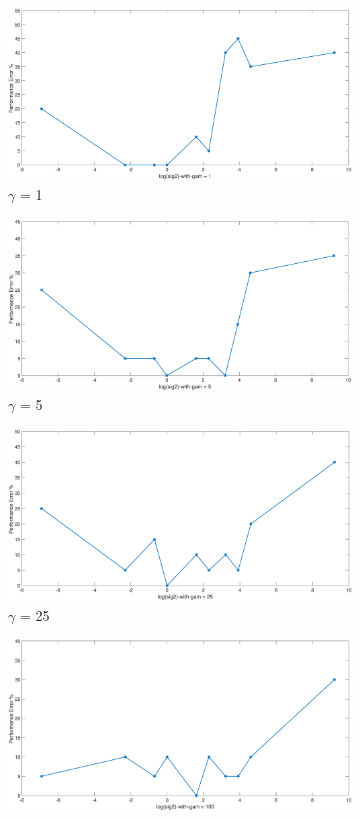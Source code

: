 {\begin{figure}[!ht]
\begin{floatrow}
{\begin{subfigure}{.3\textwidth}
			\label{fig:rand_gamma(0.01)}
		\end{subfigure}%
		\begin{subfigure}{.3\textwidth}
			\includegraphics[height=0.35\linewidth,width=0.7\linewidth]{Exercise1/Report/Ex1.3_gam(1).eps}
			\caption{$\gamma$ = 1}
			\label{fig:rand_gamma(1))}
		\end{subfigure}
		\begin{subfigure}{.3\textwidth}
			\includegraphics[height=0.35\linewidth,width=0.7\linewidth]{Exercise1/Report/Ex1.3_gam(5).eps}
			\caption{$\gamma$ = 5}
			\label{fig:rand_gamma(5)}
		\end{subfigure}%
		\begin{subfigure}{.3\textwidth}
			\includegraphics[height=0.35\linewidth,width=0.7\linewidth]{Exercise1/Report/Ex1.3_gam(25).eps}
			\caption{$\gamma$ = 25}
			\label{fig:rand_gamma(25)}
		\end{subfigure}
		\begin{subfigure}{.3\textwidth}
			\includegraphics[height=0.35\linewidth,width=0.7\linewidth]{Exercise1/Report/Ex1.3_gam(100).eps}

\end{subfigure}}
\end{floatrow}
\end{figure}}
